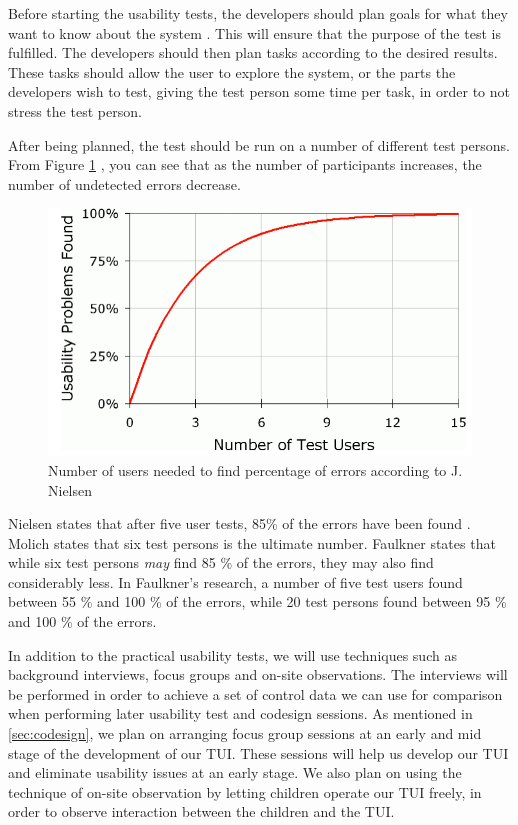 Before starting the usability tests, the developers should plan goals for what they want to know about the system \cite{isosoftwareengineering}. This will ensure that the purpose of the test is fulfilled. The developers should then plan tasks according to the desired results. These tasks should allow the user to explore the system, or the parts the developers wish to test, giving the test person some time per task, in order to not stress the test person. 

After being planned, the test should be run on a number of different test persons. From Figure \ref{fig:numberoftests}
, you can see that as the number of participants increases, the number of undetected errors decrease. 



 \begin{figure}
 		\centering
 			\includegraphics[scale=0.4]{Pictures/app-screenshots/numberoftests.png}
 		\caption{Number of users needed to find percentage of errors according to J. Nielsen\cite{nielsennumberoftests}}
 		 		\label{fig:numberoftests}
 \end{figure}


Nielsen states that after five user tests, 85\% of the errors have been found \cite{nielsennumberoftests}. Molich\cite{molich2008usable} states that six test persons is the ultimate number. Faulkner \cite{faulkner2003beyond} states that while six test persons \textit{may} find 85 \% of the errors, they may also find considerably less. In Faulkner's research, a number of five test users found between 55 \% and 100 \% of the errors, while 20 test persons found between 95 \% and 100 \% of the errors. 

In addition to the practical usability tests, we will use techniques such as background interviews, focus groups and on-site observations. The interviews will be performed in order to achieve a set of control data we can use for comparison when performing later usability test and codesign sessions. As mentioned in \ref{sec:codesign}, we plan on arranging focus group sessions at an early and mid stage of the development of our TUI. These sessions will help us develop our TUI and eliminate usability issues at an early stage. We also plan on using the technique of on-site observation by letting children operate our TUI freely, in order to observe interaction between the children and the TUI. 


